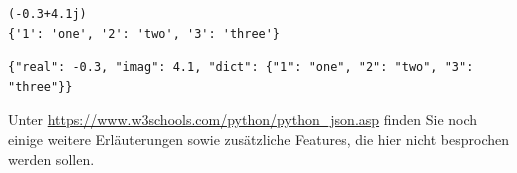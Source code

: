 \begin{cmdbox}
\begin{verbatim}
(-0.3+4.1j)
{'1': 'one', '2': 'two', '3': 'three'}
\end{verbatim}
\end{cmdbox}

\begin{cmdbox}
\begin{verbatim}
{"real": -0.3, "imag": 4.1, "dict": {"1": "one", "2": "two", "3": "three"}}
\end{verbatim}
\end{cmdbox}

Unter \url{https://www.w3schools.com/python/python_json.asp} finden Sie noch einige weitere Erläuterungen sowie zusätzliche Features, die hier nicht besprochen werden sollen.
